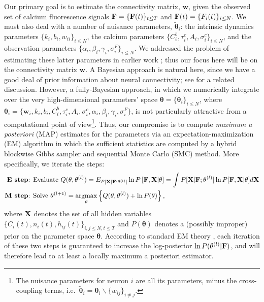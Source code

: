 \documentclass[aoas,preprint]{imsart}
\newcommand{\bth}{\mathbf{\theta}}
\newcommand{\w}{w}
\newcommand{\bw}{\mathbf{\w}}
\DeclareMathOperator*{\argmax}{argmax}
\newcommand{\bF}{{\bf F}}
\newcommand{\bX}{{\bf X}}
\newcommand{\tbth}{\tilde{\bth}}
\begin{document}
Our primary goal is to estimate the connectivity matrix, $\bw$, given the observed set of calcium fluorescence signals $\bF=\{\bF(t)\}_{t\leq T}$ and $\bF(t)=\{F_i(t)\}_{i\leq N}$. We must also deal with a number of nuisance parameters, $\tbth_i$: the intrinsic dynamics parameters $\{k_i, b_i, w_{ii}\}_{i\leq N}$, the calcium parameters $\{C^b_i, \tau^c_i, A_i, \sigma^c_i\}_{i\leq N}$, and the observation parameters $\{\alpha_i, \beta_i, \gamma_i, \sigma^F_i\}_{i\leq N}$. We addressed the problem of estimating these latter parameters in earlier work \cite{Vogelstein2009}; thus our focus here will be on the connectivity matrix $\bw$. A Bayesian approach is natural here, since we have a good deal of prior information about neural connectivity; see \cite{Rigat06} for a related discussion. However, a fully-Bayesian approach, in which we numerically integrate over the very high-dimensional parameters' space $\bth= \{\bth_i\}_{i\leq N}$, where $\bth_i=\{\bw_i, k_i, b_i, C^b_i, \tau^c_i, A_i, \sigma^c_i, \alpha_i, \beta_i, \gamma_i, \sigma^F_i\}$, is not particularly attractive from a computational point of view\footnote{The nuisance parameters for neuron $i$ are all its parameters, minus the cross-coupling terms, i.e.\ $\tbth_i =\bth_i \backslash \{w_{ij}\}_{i\neq j}$.}. Thus, our compromise is to compute \emph{maximum a posteriori} (MAP) estimates for the parameters via an expectation-maximization (EM) algorithm in which the sufficient statistics are computed by a hybrid blockwise Gibbs sampler and sequential Monte Carlo (SMC) method. More specifically, we iterate the steps:
\begin{align*}
\textbf{E step} &\text{: Evaluate } Q(\bth,\bth^{(l)}) = E_{P[\bX |
\bF; \bth^{(l)}]} \ln P \left[ \bF, \bX | \bth \right] = \int P[\bX |
\bF; \bth^{(l)}] \ln P[\bF, \bX | \bth] d \bX \\ \textbf{M step}
&\text{: Solve } \bth^{(l+1)} = \argmax_{\bth} \left\{
Q(\bth,\bth^{(l)}) + \ln P(\bth) \right\},
\end{align*}
where $\bX$ denotes the set of all hidden variables $\{ C_i(t), n_i(t), h_{ij}(t) \}_{i,j \leq N, t \leq T}$ and $P(\bth)$ denotes a (possibly improper) prior on the parameter space $\bth$. According to standard EM theory \cite{DLR77,McLachlanKrishnan96}, each iteration of these two steps is guaranteed to increase the log-posterior $\ln P(\bth^{(l)} | \bF)$, and will therefore lead to at least a locally maximum a posteriori estimator.
\end{document}
